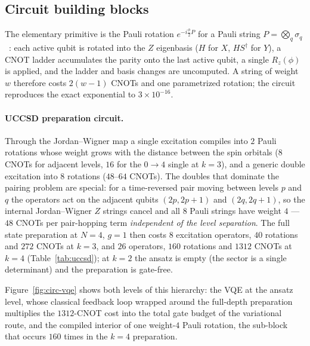 \documentclass[
  aps,            %
  prc,            %
  reprint,        %
  superscriptaddress,
  floatfix,
  nofootinbib
]{revtex4-2}
\begin{document}
\subsection{Circuit building blocks}
\label{sec:blocks}
The elementary primitive is the Pauli rotation $e^{-i\frac{\phi}{2}P}$ for a
Pauli string $P=\bigotimes_q\sigma_q$~\cite{NielsenChuang}: each active qubit is rotated into the $Z$
eigenbasis ($H$ for $X$, $HS^\dagger$ for $Y$), a CNOT ladder accumulates the
parity onto the last active qubit, a single $R_z(\phi)$ is applied, and the
ladder and basis changes are uncomputed.  A string of weight $w$ therefore costs
$2(w-1)$ CNOTs and one parametrized rotation; the circuit reproduces the exact
exponential to $3\times10^{-16}$.

\paragraph{UCCSD preparation circuit.}
Through the Jordan--Wigner map a single excitation compiles into $2$ Pauli
rotations whose weight grows with the distance between the spin orbitals
($8$ CNOTs for adjacent levels, $16$ for the $0\!\to\!4$ single at $k=3$), and a
generic double excitation into $8$ rotations ($48$--$64$ CNOTs).  The doubles
that dominate the pairing problem are special: for a time-reversed pair moving
between levels $p$ and $q$ the operators act on the adjacent qubits
$(2p,2p{+}1)$ and $(2q,2q{+}1)$, so the internal Jordan--Wigner $Z$ strings
cancel and all $8$ Pauli strings have weight $4$ --- $48$ CNOTs per pair-hopping
term \emph{independent of the level separation}.  The full state preparation at
$N=4$, $g=1$ then costs $8$ excitation operators, $40$ rotations and $272$ CNOTs
at $k=3$, and $26$ operators, $160$ rotations and $1312$ CNOTs at $k=4$
(Table~\ref{tab:uccsd}); at $k=2$ the ansatz is empty (the sector is a single
determinant) and the preparation is gate-free.

Figure~\ref{fig:circ-vqe} shows both levels of this hierarchy: the VQE at
the ansatz level, whose classical feedback loop wrapped around the
full-depth preparation multiplies the $1312$-CNOT cost into the total gate
budget of the variational route, and the compiled interior of one
weight-$4$ Pauli rotation, the sub-block that occurs $160$ times in the
$k=4$ preparation.
\end{document}
